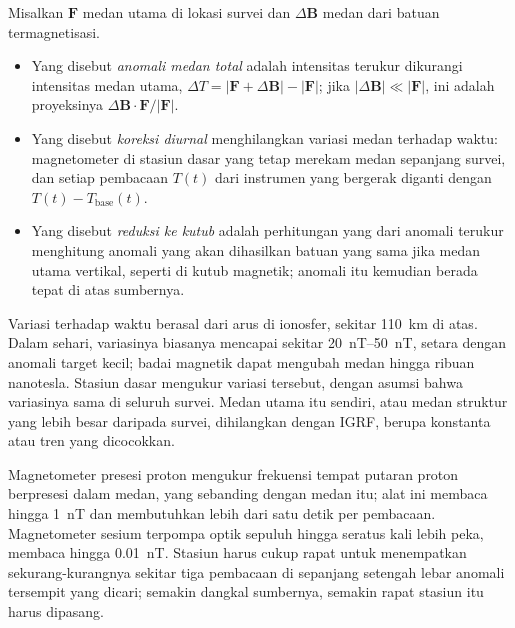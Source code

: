 \begin{definition}\label{def:b3:field-lab-methods-3:magnetic}
Misalkan $\mathbf{F}$ medan utama di lokasi survei dan $\Delta\mathbf{B}$
medan dari batuan termagnetisasi.
\begin{itemize}
  \item Yang disebut \emph{anomali medan total} adalah
        intensitas terukur dikurangi intensitas medan utama, $\Delta T =
        |\mathbf{F} + \Delta\mathbf{B}| - |\mathbf{F}|$; jika
        $|\Delta\mathbf{B}| \ll |\mathbf{F}|$, ini adalah proyeksinya
        $\Delta\mathbf{B}\cdot\mathbf{F}/|\mathbf{F}|$.
  \item Yang disebut \emph{koreksi diurnal} menghilangkan
        variasi medan terhadap waktu: magnetometer di stasiun dasar yang tetap
        merekam medan sepanjang survei, dan setiap pembacaan $T(t)$ dari
        instrumen yang bergerak diganti dengan $T(t) -
        T_\mathrm{base}(t)$.
  \item Yang disebut \emph{reduksi ke kutub} adalah
        perhitungan yang dari anomali terukur menghitung anomali yang akan
        dihasilkan batuan yang sama jika medan utama vertikal, seperti di kutub magnetik;
        anomali itu kemudian berada tepat di atas sumbernya.
\end{itemize}
\end{definition}

Variasi terhadap waktu berasal dari arus di ionosfer, sekitar
\qty{110}{km} di atas. Dalam sehari, variasinya biasanya mencapai sekitar
\qtyrange{20}{50}{nT}, setara dengan anomali target kecil; badai
magnetik dapat mengubah medan hingga ribuan nanotesla. Stasiun dasar
mengukur variasi tersebut, dengan asumsi bahwa variasinya
sama di seluruh survei. Medan utama itu sendiri, atau medan
struktur yang lebih besar daripada survei, dihilangkan dengan IGRF, berupa konstanta
atau tren yang dicocokkan.

Magnetometer presesi proton mengukur frekuensi tempat putaran proton
berpresesi dalam medan, yang sebanding dengan medan itu; alat ini
membaca hingga \qty{1}{nT} dan membutuhkan lebih dari satu detik per pembacaan. Magnetometer
sesium terpompa optik sepuluh hingga seratus kali lebih
peka, membaca hingga \qty{0.01}{nT}. Stasiun harus cukup rapat
untuk menempatkan sekurang-kurangnya sekitar tiga pembacaan di sepanjang setengah lebar
anomali tersempit yang dicari; semakin dangkal sumbernya, semakin rapat
stasiun itu harus dipasang.

